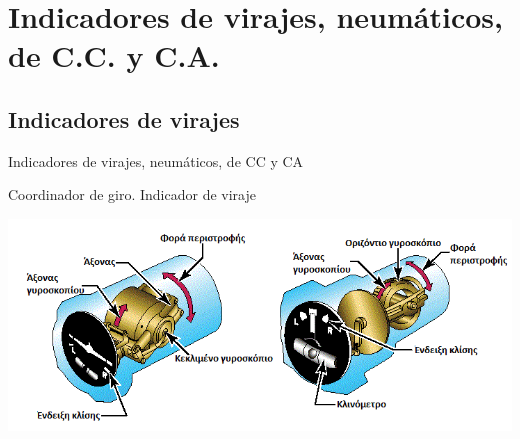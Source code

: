 
\section{Indicadores de virajes, neum\'aticos, de C.C. y C.A.}
\label{sec:indicadores.de.virajes}

\subsection{Indicadores de virajes}
\label{sec:indicadores.virajes.basico}


\begin{frame}{Indicadores de virajes, neum\'aticos, de CC y CA}

  \begin{block}{Coordinador de giro. Indicador de viraje}

        \includegraphics[width=0.95\linewidth]{05.instrumentos.giroscopicos.imagenes/05.02.indicadores.viraje.imagenes/indicador_giro_viraje.png}

      \end{block}

\end{frame}


